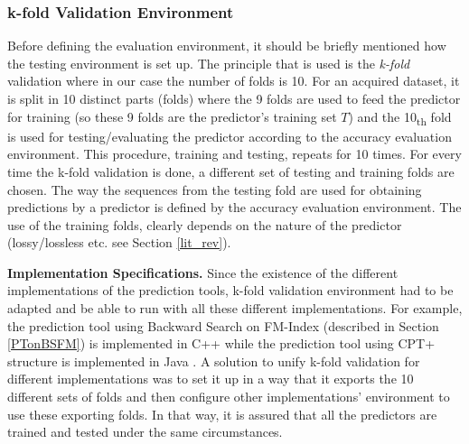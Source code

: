 \subsubsection{k-fold Validation Environment}
Before defining the evaluation environment, it should be briefly mentioned how the testing environment is set up. The principle that is used is the \emph{k-fold} validation \cite{Kohavi} where in our case the number of folds is 10. For an acquired dataset, it is split in 10 distinct parts (folds) where the 9 folds are used to feed the predictor for training (so these 9 folds are the predictor's training set $T$) and the 10\textsubscript{th} fold is used for testing/evaluating the predictor according to the accuracy evaluation environment. This procedure, training and testing, repeats for 10 times. For every time the k-fold validation is done, a different set of testing and training folds are chosen. The way the sequences from the testing fold are used for obtaining predictions by a predictor is defined by the accuracy evaluation environment. The use of the training folds, clearly depends on the nature of the predictor (lossy/lossless etc. see Section \ref{lit_rev}).
\par\textbf{Implementation Specifications.} Since the existence of the different implementations of the prediction tools, k-fold validation environment had to be adapted and be able to run with all these different implementations. For example, the prediction tool using Backward Search on FM-Index (described in Section  \ref{PTonBSFM}) is implemented in C++ while the prediction tool using CPT+ structure is implemented in Java \cite{gueniche_git}. A solution to unify k-fold validation for different implementations was to set it up in a way that it exports the 10 different sets of folds and then configure other implementations' environment to use these exporting folds. In that way, it is assured that all the predictors are trained and tested under the same circumstances.

